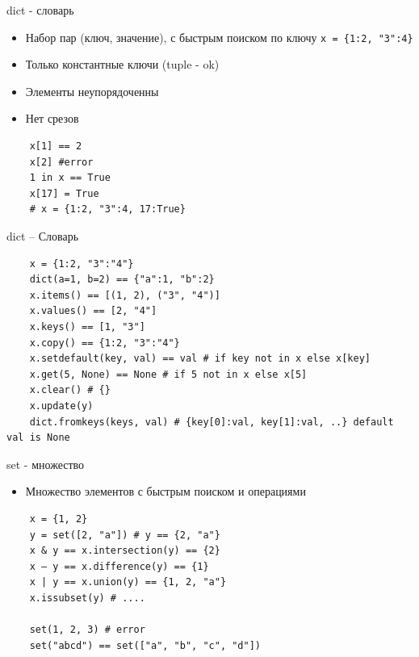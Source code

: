 \documentclass{article}
\begin{document}
\begin{center} dict - словарь \end{center}
\begin{itemize}
	\item Набор пар (ключ, значение), с быстрым поиском по ключу
	\lstinline$x = {1:2, "3":4}$
	\item Только константные ключи (tuple - ok)
	\item Элементы неупорядоченны
	\item Нет срезов
\end{itemize}
\vspace{15pt}
\begin{lstlisting}
	x[1] == 2
	x[2] #error
	1 in x == True
	x[17] = True
	# x = {1:2, "3":4, 17:True}
\end{lstlisting}
\newpage

\begin{center} dict – Словарь \end{center}
\vspace{15pt}
\begin{lstlisting}
	x = {1:2, "3":"4"}
	dict(a=1, b=2) == {"a":1, "b":2}
	x.items() == [(1, 2), ("3", "4")]
	x.values() == [2, "4"]
	x.keys() == [1, "3"]
	x.copy() == {1:2, "3":"4"}
	x.setdefault(key, val) == val # if key not in x else x[key]
	x.get(5, None) == None # if 5 not in x else x[5]
	x.clear() # {}
	x.update(y)
	dict.fromkeys(keys, val) # {key[0]:val, key[1]:val, ..} default val is None
\end{lstlisting}
\newpage

\begin{center} set - множество \end{center}
\begin{itemize}
	\item Множество элементов с быстрым поиском и операциями
\end{itemize}
\vspace{15pt}
\begin{lstlisting}
	x = {1, 2} 
	y = set([2, "a"]) # y == {2, "a"}
	x & y == x.intersection(y) == {2}
	x – y == x.difference(y) == {1}
	x | y == x.union(y) == {1, 2, "a"}
	x.issubset(y) # ....

	set(1, 2, 3) # error
	set("abcd") == set(["a", "b", "c", "d"])
\end{lstlisting}
\newpage
\end{document}
